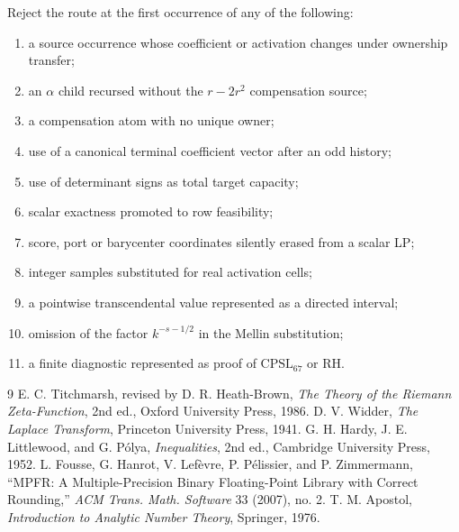 \documentclass[11pt]{article}
\newcommand{\CPSL}{\mathrm{CPSL}_{67}}
\newcommand{\1}{\mathbf 1}
\begin{document}
Reject the route at the first occurrence of any of the following:
\begin{enumerate}
\item a source occurrence whose coefficient or activation changes under ownership transfer;
\item an $\alpha$ child recursed without the $r-2r^2$ compensation source;
\item a compensation atom with no unique owner;
\item use of a canonical terminal coefficient vector after an odd history;
\item use of determinant signs as total target capacity;
\item scalar exactness promoted to row feasibility;
\item score, port or barycenter coordinates silently erased from a scalar LP;
\item integer samples substituted for real activation cells;
\item a pointwise transcendental value represented as a directed interval;
\item omission of the factor $k^{-s-1/2}$ in the Mellin substitution;
\item a finite diagnostic represented as proof of $\CPSL$ or RH.
\end{enumerate}

\begin{thebibliography}{9}
E. C. Titchmarsh, revised by D. R. Heath-Brown,
\emph{The Theory of the Riemann Zeta-Function}, 2nd ed., Oxford University Press, 1986.
D. V. Widder, \emph{The Laplace Transform}, Princeton University Press, 1941.
G. H. Hardy, J. E. Littlewood, and G. P\'olya,
\emph{Inequalities}, 2nd ed., Cambridge University Press, 1952.
L. Fousse, G. Hanrot, V. Lef\`evre, P. P\'elissier, and P. Zimmermann,
``MPFR: A Multiple-Precision Binary Floating-Point Library with Correct Rounding,''
\emph{ACM Trans. Math. Software} 33 (2007), no. 2.
T. M. Apostol, \emph{Introduction to Analytic Number Theory}, Springer, 1976.
\end{thebibliography}
\end{document}
